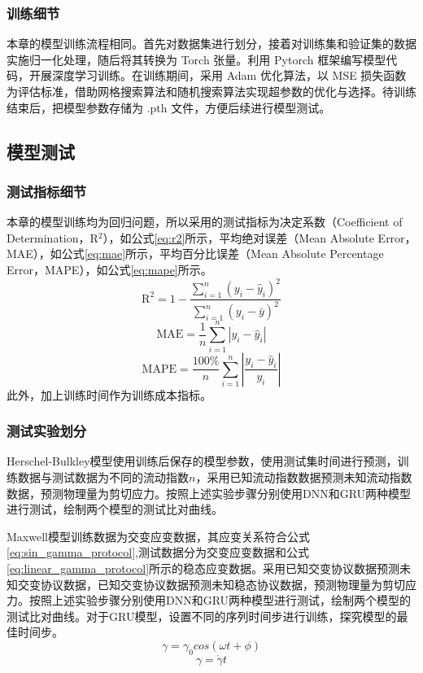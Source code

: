 \subsubsection{训练细节}
本章的模型训练流程相同。首先对数据集进行划分，接着对训练集和验证集的数据实施归一化处理，随后将其转换为 Torch 张量。利用 Pytorch 框架编写模型代码，开展深度学习训练。在训练期间，采用 Adam 优化算法，以 MSE 损失函数为评估标准，借助网格搜索算法和随机搜索算法实现超参数的优化与选择。待训练结束后，把模型参数存储为 .pth 文件，方便后续进行模型测试。

\subsection{模型测试}
\subsubsection{测试指标细节}
本章的模型训练均为回归问题，所以采用的测试指标为决定系数（Coefficient of Determination，R$^2$），如公式\eqref{eq:r2}所示，平均绝对误差（Mean Absolute Error，MAE），如公式\eqref{eq:mae}所示，平均百分比误差（Mean Absolute Percentage Error，MAPE），如公式\eqref{eq:mape}所示。
\begin{equation}
  \text{R}^2 = 1 - \frac{\sum_{i=1}^{n} (y_i - \hat{y}_i)^2}{\sum_{i=1}^{n} (y_i - \bar{y})^2} \label{eq:r2}
\end{equation}
\begin{equation}
  \text{MAE} = \frac{1}{n} \sum_{i=1}^{n} |y_i - \hat{y}_i| \label{eq:mae}
\end{equation}
\begin{equation}
  \text{MAPE} = \frac{100\%}{n} \sum_{i=1}^{n} \left| \frac{y_i - \hat{y}_i}{y_i} \right| \label{eq:mape}
\end{equation}
此外，加上训练时间作为训练成本指标。

\subsubsection{测试实验划分}
Herschel-Bulkley模型使用训练后保存的模型参数，使用测试集时间进行预测，训练数据与测试数据为不同的流动指数$n$，采用已知流动指数数据预测未知流动指数数据，预测物理量为剪切应力。按照上述实验步骤分别使用DNN和GRU两种模型进行测试，绘制两个模型的测试比对曲线。

Maxwell模型训练数据为交变应变数据，其应变关系符合公式\eqref{eq:sin_gamma_protocol},测试数据分为交变应变数据和公式\eqref{eq:linear_gamma_protocol}所示的稳态应变数据。采用已知交变协议数据预测未知交变协议数据，已知交变协议数据预测未知稳态协议数据，预测物理量为剪切应力。按照上述实验步骤分别使用DNN和GRU两种模型进行测试，绘制两个模型的测试比对曲线。对于GRU模型，设置不同的序列时间步进行训练，探究模型的最佳时间步。
\begin{equation}
  \gamma=\gamma_0cos(\omega t+\phi) \label{eq:sin_gamma_protocol}
\end{equation}
\begin{equation}
  \gamma=\dot{\gamma}t \label{eq:linear_gamma_protocol}
\end{equation}

